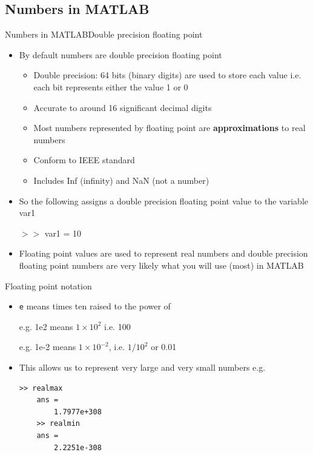 \documentclass{beamer}
\begin{document}
\subsection{Numbers in MATLAB}
\begin{frame}{Numbers in MATLAB}{Double precision floating point}
	\begin{itemize}
		\item By default numbers are double precision floating point
		\begin{itemize}
			\item Double precision: 64 bits (binary digits) are used to store each value i.e. each bit represents either the value 1 or 0
			\item Accurate to around 16 significant decimal digits
			\item Most numbers represented by floating point are \textbf{approximations} to real numbers
			\item Conform to IEEE standard
			\item Includes Inf (infinity) and NaN (not a number)
		\end{itemize}
		\item So the following assigns a double precision floating point value to the variable var1
		
		$>>$ var1 = 10
		\item Floating point values are used to represent real numbers and double precision floating point numbers are very likely what you will use (most) in MATLAB
	\end{itemize}
\end{frame}

\begin{frame}[fragile]{Floating point notation}
	\begin{itemize}
		\item \texttt{e} means times ten raised to the power of 
		
		e.g. 1e2 means $1 \times 10^{2}$ i.e. 100
		
		e.g. 1e-2 means $1 \times 10^{-2}$, i.e. $1/10^{2}$ or 0.01
		\item This allows us to represent very large and very small numbers e.g.
	\begin{lstlisting}[style=Matlab-editor]
	>> realmax
	ans = 
		1.7977e+308
	>> realmin
	ans = 
		2.2251e-308	
	\end{lstlisting}
	\end{itemize} 
\end{frame}
\end{document}
